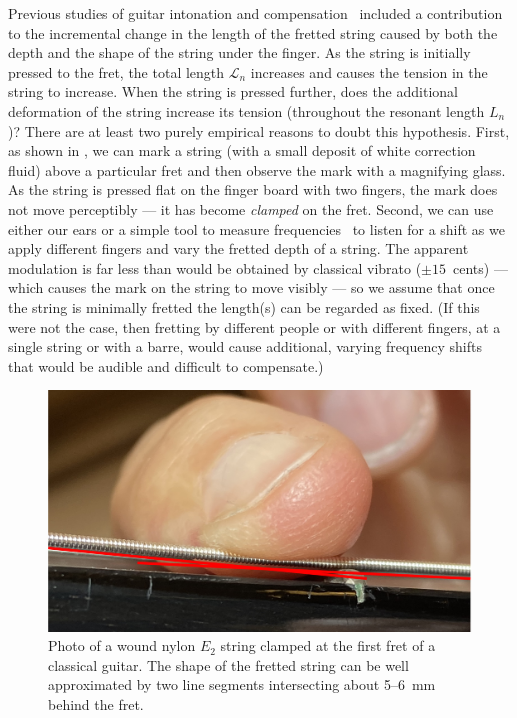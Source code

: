 Previous studies of guitar intonation and compensation~\cite{ref:byers1996cgi,ref:varieschi2010icf} included a contribution to the incremental change in the length of the fretted string caused by both the depth and the shape of the string under the finger. As the string is initially pressed to the fret, the total length $\mathcal{L}_n$ increases and causes the tension in the string to increase. When the string is pressed further, does the additional deformation of the string increase its tension (throughout the resonant length $L_n$)? There are at least two purely empirical reasons to doubt this hypothesis. First, as shown in , we can mark a string (with a small deposit of white correction fluid) above a particular fret and then observe the mark with a magnifying glass. As the string is pressed flat on the finger board with two fingers, the mark does not move perceptibly --- it has become \emph{clamped} on the fret. Second, we can use either our ears or a simple tool to measure frequencies~\cite{ref:pgtweb} to listen for a shift as we apply different fingers and vary the fretted depth of a string. The apparent modulation is far less than would be obtained by classical vibrato ($\pm15$~cents) --- which causes the mark on the string to move visibly --- so we assume that once the string is minimally fretted the length(s) can be regarded as fixed. (If this were not the case, then fretting by different people or with different fingers, at a single string or with a barre, would cause additional, varying frequency shifts that would be audible and difficult to compensate.)

\begin{figure}
    \centering
    \includegraphics[width=6.0in]{figures/fretting_photo}
    \caption{\label{fig:fretting_photo} Photo of a wound nylon $E_2$ string clamped at the first fret of a classical guitar. The shape of the fretted string can be well approximated by two line segments intersecting about 5--6~mm behind the fret.}
\end{figure}


